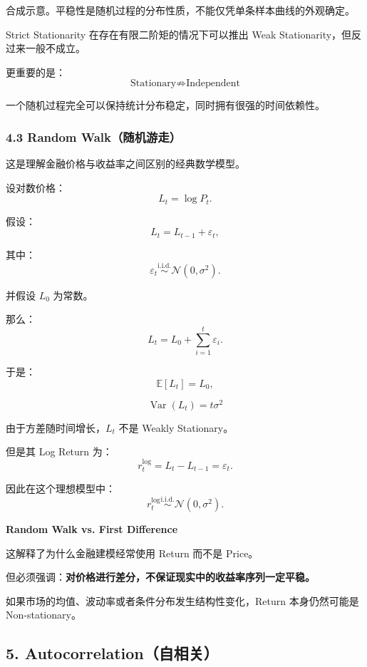 合成示意。平稳性是随机过程的分布性质，不能仅凭单条样本曲线的外观确定。

Strict Stationarity 在存在有限二阶矩的情况下可以推出 Weak Stationarity，但反过来一般不成立。

更重要的是：
\[\boxed{
\text{Stationary}
\not\Rightarrow
\text{Independent}
}\]

一个随机过程完全可以保持统计分布稳定，同时拥有很强的时间依赖性。

\hypertarget{part-4-52-0001-random-walkux968fux673aux6e38ux8d70}{%
\subsubsection{4.3 Random Walk（随机游走）}\label{part-4-52-0001-random-walkux968fux673aux6e38ux8d70}}

这是理解金融价格与收益率之间区别的经典数学模型。

设对数价格：
\[L_t=\log P_t.\]

假设：
\[L_t=L_{t-1}+\varepsilon_t,\]

其中：
\[\varepsilon_t
\overset{\mathrm{i.i.d.}}{\sim}
\mathcal N(0,\sigma^2).\]

并假设 \(L_0\) 为常数。

那么：
\[L_t=L_0+\sum_{i=1}^{t}\varepsilon_i.\]

于是：
\[\mathbb E[L_t]=L_0,\]

\[\boxed{
\operatorname{Var}(L_t)=t\sigma^2
}\]

由于方差随时间增长，\(L_t\) 不是 Weakly Stationary。

但是其 Log Return 为：
\[r_t^{\log}
=
L_t-L_{t-1}
=
\varepsilon_t.\]

因此在这个理想模型中：
\[r_t^{\log}
\overset{\mathrm{i.i.d.}}{\sim}
\mathcal N(0,\sigma^2).\]

\textbf{Random Walk vs. First Difference}


这解释了为什么金融建模经常使用 Return 而不是 Price。

但必须强调：\textbf{对价格进行差分，不保证现实中的收益率序列一定平稳。}

如果市场的均值、波动率或者条件分布发生结构性变化，Return 本身仍然可能是 Non-stationary。

\hypertarget{part-4-52-0001-autocorrelationux81eaux76f8ux5173}{%
\subsection{5. Autocorrelation（自相关）}\label{part-4-52-0001-autocorrelationux81eaux76f8ux5173}}

